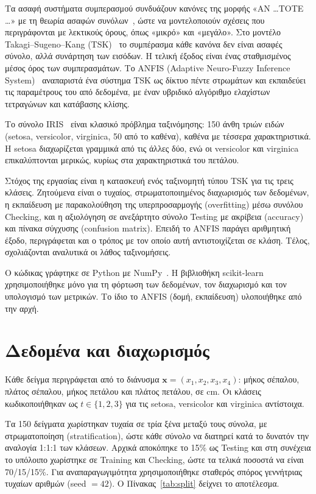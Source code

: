 \documentclass[conference]{IEEEtran}
\begin{document}
Τα ασαφή συστήματα συμπερασμού συνδυάζουν κανόνες της μορφής «ΑΝ \ldots ΤΟΤΕ \ldots»
με τη θεωρία ασαφών συνόλων~\cite{zadeh1965,adamidis}, ώστε να μοντελοποιούν σχέσεις που
περιγράφονται με λεκτικούς όρους, όπως «μικρό» και «μεγάλο». Στο μοντέλο Takagi--Sugeno--Kang
(TSK)~\cite{takagi1985,sugeno1988} το συμπέρασμα κάθε κανόνα δεν είναι ασαφές
σύνολο, αλλά συνάρτηση των εισόδων. Η τελική έξοδος είναι ένας σταθμισμένος μέσος
όρος των συμπερασμάτων. Το ANFIS (Adaptive Neuro-Fuzzy Inference System)~\cite{jang1993}
αναπαριστά ένα σύστημα TSK ως δίκτυο πέντε στρωμάτων και εκπαιδεύει τις παραμέτρους
του από δεδομένα, με έναν υβριδικό αλγόριθμο ελαχίστων τετραγώνων και κατάβασης κλίσης.

Το σύνολο IRIS~\cite{fisher1936} είναι κλασικό πρόβλημα ταξινόμησης: 150 άνθη
τριών ειδών (setosa, versicolor, virginica, 50 από το καθένα), καθένα με τέσσερα
χαρακτηριστικά. Η setosa διαχωρίζεται γραμμικά από τις άλλες δύο, ενώ οι versicolor
και virginica επικαλύπτονται μερικώς, κυρίως στα χαρακτηριστικά του πετάλου.

Στόχος της εργασίας είναι η κατασκευή ενός ταξινομητή τύπου TSK για τις τρεις κλάσεις.
Ζητούμενα είναι ο τυχαίος, στρωματοποιημένος διαχωρισμός των δεδομένων,
η εκπαίδευση με παρακολούθηση της υπερπροσαρμογής (overfitting) μέσω συνόλου
Checking, και η αξιολόγηση σε ανεξάρτητο σύνολο Testing με ακρίβεια (accuracy)
και πίνακα σύγχυσης (confusion matrix). Επειδή το ANFIS παράγει αριθμητική έξοδο,
περιγράφεται και ο τρόπος με τον οποίο αυτή αντιστοιχίζεται σε κλάση. Τέλος, σχολιάζονται
αναλυτικά οι λάθος ταξινομήσεις.

Ο κώδικας γράφτηκε σε Python με NumPy~\cite{numpy2020}. Η βιβλιοθήκη
scikit-learn~\cite{sklearn2011} χρησιμοποιήθηκε μόνο για τη φόρτωση των δεδομένων,
τον διαχωρισμό και τον υπολογισμό των μετρικών. Το ίδιο το ANFIS (δομή, εκπαίδευση)
υλοποιήθηκε από την αρχή.

\section{Δεδομένα και διαχωρισμός}

Κάθε δείγμα περιγράφεται από το διάνυσμα
$\mathbf{x}=(x_1,x_2,x_3,x_4)$: μήκος σέπαλου, πλάτος σέπαλου, μήκος πετάλου και
πλάτος πετάλου, σε cm. Οι κλάσεις κωδικοποιήθηκαν ως $t\in\{1,2,3\}$ για τις setosa,
versicolor και virginica αντίστοιχα.

Τα 150 δείγματα χωρίστηκαν τυχαία σε τρία ξένα μεταξύ τους σύνολα, με
στρωματοποίηση (stratification), ώστε κάθε σύνολο να διατηρεί κατά το δυνατόν την
αναλογία 1:1:1 των κλάσεων. Αρχικά αποκόπηκε το 15\% ως Testing και στη
συνέχεια το υπόλοιπο χωρίστηκε σε Training και Checking, ώστε τα τελικά ποσοστά να
είναι 70/15/15\%. Για αναπαραγωγιμότητα χρησιμοποιήθηκε σταθερός σπόρος
γεννήτριας τυχαίων αριθμών (seed $=42$). Ο Πίνακας~\ref{tab:split} δείχνει το
αποτέλεσμα.
\end{document}
